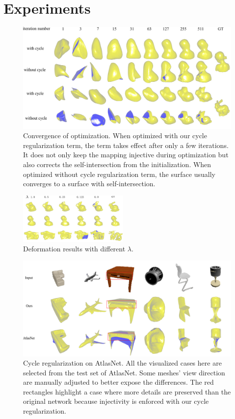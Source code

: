 \section{Experiments}
\begin{figure}[t]
	\centering
	\includegraphics[width=\linewidth]{img/opt/opt}
	\caption{Convergence of optimization. When optimized with our cycle regularization term, the term takes effect after only a few iterations. It does not only keep the mapping injective during optimization but also corrects the self-intersection from the initialization. When optimized without cycle regularization term, the surface usually converges to a surface with self-intersection.}
	\label{fig:opt}
\end{figure}
\begin{figure}
	\begin{center}
		\includegraphics[width=0.48\textwidth]{img/opt/lambda}
	\end{center}
	\caption{Deformation results with different $\lambda$.}
	\label{fig:lambda}
\end{figure}
\begin{figure}[t]
	\centering
	\includegraphics[width=\linewidth]{img/atlas/svr}
	\caption{Cycle regularization on AtlasNet. All the visualized cases here are selected from the test set of AtlasNet. Some meshes' view direction are manually adjusted to better expose the differences. The red rectangles highlight a case where more details are preserved than the original network because injectivity is enforced with our cycle regularization.}
	\label{fig:svr}
\end{figure}

